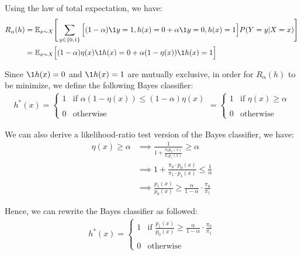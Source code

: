 \begin{solution*}
    Using the law of total expectation, we have:
    \begin{align*}
        R_\alpha(h)
            &= \mathbb{E}_{x\sim X}\Bigg[
                \sum_{y\in\{0,1\}}\Big[(1-\alpha)\1{y=1, h(x)=0} + \alpha\1{y=0, h(x)=1} \Big] P(Y=y|X=x) 
            \Bigg] \\
            &= \mathbb{E}_{x\sim X}\Big[
                (1-\alpha)\eta(x)\1{h(x)=0} + \alpha(1-\eta(x))\1{h(x)=1}
            \Big]
    \end{align*}

    \noindent Since $\1{h(x)=0}$ and $\1{h(x)=1}$ are mutually exclusive, in order for $R_\alpha(h)$ to be minimize, we define the following Bayes classifier:
    \begin{align*}
        h^*(x) = \begin{cases}
            1 &\text{if } \alpha(1-\eta(x)) \le (1-\alpha)\eta(x)
            \\ \\
            0 &\text{otherwise}
        \end{cases}
        = \begin{cases}
            1 &\text{if } \eta(x) \ge \alpha
            \\ \\
            0 &\text{otherwise}
        \end{cases}
    \end{align*}

    \noindent We can also derive a likelihood-ratio test version of the Bayes classifier, we have:
    \begin{align*}
        \eta(x) \ge \alpha &\implies \frac{1}{1+\frac{\pi_0p_0(x)}{\pi_1p_1(x)}} \ge \alpha \\
            &\implies 1 + \frac{\pi_0\cdot p_0(x)}{\pi_1\cdot p_1(x)}\le \frac{1}{\alpha} \\
            &\implies \frac{p_1(x)}{p_0(x)} \ge \frac{\alpha}{1-\alpha}\cdot \frac{\pi_0}{\pi_1}
    \end{align*}

    \noindent Hence, we can rewrite the Bayes classifier as followed:
    \begin{align*}
        h^*(x) = \begin{cases}
            1 &\text{if } \frac{p_1(x)}{p_0(x)} \ge \frac{\alpha}{1-\alpha}\cdot \frac{\pi_0}{\pi_1} 
            \\ \\
            0 &\text{otherwise}
        \end{cases}
    \end{align*}


\end{solution*}
